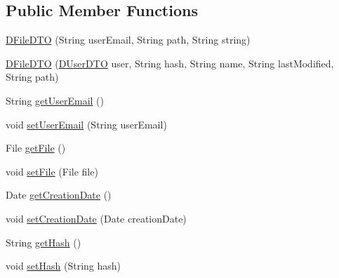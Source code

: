 \subsection*{Public Member Functions}
\begin{DoxyCompactItemize}
\item 
\mbox{\hyperlink{classes_1_1deusto_1_1bspq18_1_1e6_1_1_deusto_box_1_1_server_1_1dto_1_1_d_file_d_t_o_a19ac07787ead7e0fc9eb7576da30b92f}{D\+File\+D\+TO}} (String user\+Email, String path, String string)
\item 
\mbox{\hyperlink{classes_1_1deusto_1_1bspq18_1_1e6_1_1_deusto_box_1_1_server_1_1dto_1_1_d_file_d_t_o_ad2cb5e2d9eaa852c2fe0703f780418f2}{D\+File\+D\+TO}} (\mbox{\hyperlink{classes_1_1deusto_1_1bspq18_1_1e6_1_1_deusto_box_1_1_server_1_1dto_1_1_d_user_d_t_o}{D\+User\+D\+TO}} user, String hash, String name, String last\+Modified, String path)
\item 
String \mbox{\hyperlink{classes_1_1deusto_1_1bspq18_1_1e6_1_1_deusto_box_1_1_server_1_1dto_1_1_d_file_d_t_o_ac5bd4404bfa8c63c49a1e2eb7b1a0665}{get\+User\+Email}} ()
\item 
void \mbox{\hyperlink{classes_1_1deusto_1_1bspq18_1_1e6_1_1_deusto_box_1_1_server_1_1dto_1_1_d_file_d_t_o_a74e4b06618c7effbe02c06c37c85096e}{set\+User\+Email}} (String user\+Email)
\item 
File \mbox{\hyperlink{classes_1_1deusto_1_1bspq18_1_1e6_1_1_deusto_box_1_1_server_1_1dto_1_1_d_file_d_t_o_a7dd4b001dc4fa32bf91bba51f4e32c6f}{get\+File}} ()
\item 
void \mbox{\hyperlink{classes_1_1deusto_1_1bspq18_1_1e6_1_1_deusto_box_1_1_server_1_1dto_1_1_d_file_d_t_o_aca6d5bfa38c2a71d0d5f5230ec595878}{set\+File}} (File file)
\item 
Date \mbox{\hyperlink{classes_1_1deusto_1_1bspq18_1_1e6_1_1_deusto_box_1_1_server_1_1dto_1_1_d_file_d_t_o_ae705402a1bcd5d6ef895f8c3a2fe104d}{get\+Creation\+Date}} ()
\item 
void \mbox{\hyperlink{classes_1_1deusto_1_1bspq18_1_1e6_1_1_deusto_box_1_1_server_1_1dto_1_1_d_file_d_t_o_a6286bdd3a69dd0d04e4c0d7e22c11ae1}{set\+Creation\+Date}} (Date creation\+Date)
\item 
String \mbox{\hyperlink{classes_1_1deusto_1_1bspq18_1_1e6_1_1_deusto_box_1_1_server_1_1dto_1_1_d_file_d_t_o_a0a50b178b51a26799ccb0d8022d3cf24}{get\+Hash}} ()
\item 
void \mbox{\hyperlink{classes_1_1deusto_1_1bspq18_1_1e6_1_1_deusto_box_1_1_server_1_1dto_1_1_d_file_d_t_o_a722d0555edf87bd4233e92ec6981388d}{set\+Hash}} (String hash)

\end{DoxyCompactItemize}
